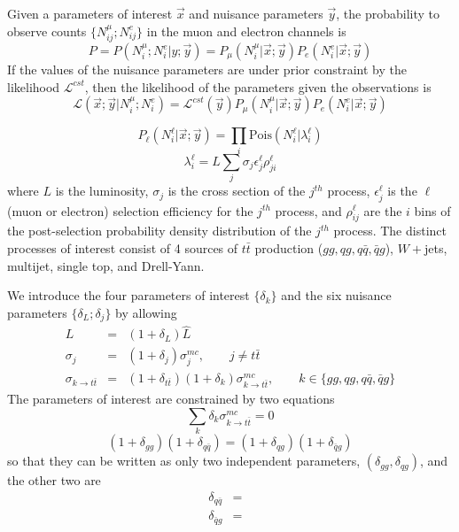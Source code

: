 \documentclass{article}
\newcommand{\lik}{\mathcal{L}}
\newcommand{\interest}{\vec{x}}
\newcommand{\nuis}{\vec{y}}
\begin{document}
Given a parameters of interest $\interest$ and nuisance parameters $\nuis$,
the probability to observe counts $\{N_{ij}^{\mu};N_{ij}^e\}$ in the
muon and electron channels is
\[P 
= P\left(N_i^{\mu};N_i^e | y;\nuis\right) =
P_{\mu}\left(N_i^{\mu}|\interest;\nuis\right)P_e\left(N_i^e|\interest;\nuis\right)\]
If the values of the nuisance parameters are under prior constraint
by the likelihood $\lik^{cst}$, then the likelihood of the parameters
given the observations is
\begin{equation}
  \lik\left(\interest;\nuis|N_i^{\mu};N_i^e\right) = \lik^{cst}(\nuis)P_{\mu}(N_i^\mu|\interest;\nuis)P_e(N_i^e|\interest;\nuis)
\end{equation}


\begin{equation}
  P_\ell\left(N_i^\ell|\interest;\nuis\right) = \prod_i \mathrm{Pois}\left(N_i^\ell|\lambda_i^\ell\right)
\end{equation}
\begin{equation}
  \lambda_i^\ell = L\sum_j\sigma_j\epsilon_j^\ell\rho_{ji}^\ell
\end{equation}
where $L$ is the luminosity, $\sigma_j$ is the cross section of the
$j^{th}$ process, $\epsilon^\ell_j$ is the $\ell$ (muon or electron)
selection efficiency for the $j^{th}$ process, and $\rho^\ell_{ij}$
are the $i$ bins of the post-selection probability density
distribution of the $j^{th}$ process.  The distinct processes of
interest consist of 4 sources of $t\bar{t}$ production
($gg,qg,q\bar{q},\bar{q}g$), $W+$jets, multijet, single top, and
Drell-Yann.

We introduce the four parameters of interest $\{\delta_k\}$ and the
six nuisance parameters $\{\delta_L;\delta_j\}$ by allowing
\begin{eqnarray}
  L &=& (1+\delta_L)\hat{L} \\
  \sigma_j &=& (1+\delta_j)\sigma_j^{mc},\qquad j\ne t\bar{t} \\
  \sigma_{k\to t\bar{t}} &=&(1+\delta_{t\bar{t}})(1+\delta_k)\sigma_{k\to t\bar{t}}^{mc},\qquad k\in\{gg,qg,q\bar{q},\bar{q}g\}
\end{eqnarray}
The parameters of interest are constrained by two equations
\begin{equation}
  \sum_k \delta_k\sigma_{k\to t\bar{t}}^{mc} = 0
\end{equation}
\begin{equation}
  (1+\delta_{gg})(1+\delta_{q\bar{q}}) = (1+\delta_{qg})(1+\delta_{\bar{q}g})
\end{equation}
so that they can be written as only two independent parameters,
$(\delta_{gg},\delta_{qg})$, and the other two are
\begin{eqnarray}
  \delta_{q\bar{q}} &=& \\
  \delta_{\bar{q}g} &=&
\end{eqnarray}
\end{document}
